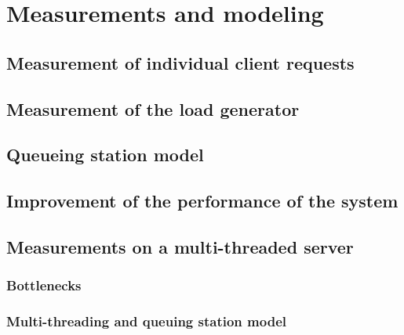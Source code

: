 \section{Measurements and modeling}
\label{sec:Measurements and modeling}

\subsection{Measurement of individual client requests}
\label{sub:Measurement of individual client requests}

\subsection{Measurement of the load generator}
\label{sub:Measurement of the load generator}

\subsection{Queueing station model}
\label{sub:Queueing station model}

\subsection{Improvement of the performance of the system}
\label{sub:Improvement of the performance of the system}

\subsection{Measurements on a multi-threaded server}
\label{sub:Measurements on a multi-threaded server}

\subsubsection{Bottlenecks}
\label{subs:Bottlenecks}


\subsubsection{Multi-threading and queuing station model}
\label{subs:Multi-threading and queuing station model}
